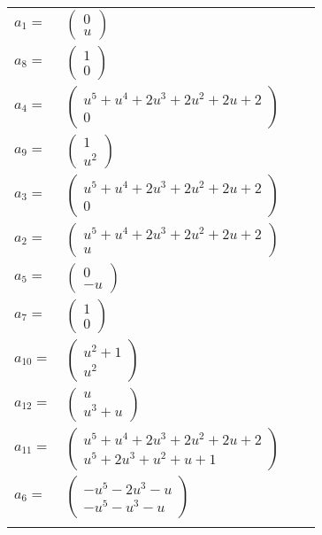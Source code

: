 \documentclass[1p]{elsarticle_modified}
\theoremstyle{definition}
\begin{document}
\begin{tabular}{m{7pt} m{180pt} m{7pt} m{180pt} }
\flushright $a_{1}=$&$\begin{pmatrix}0\\u\end{pmatrix}$ \\
\flushright $a_{8}=$&$\begin{pmatrix}1\\0\end{pmatrix}$ \\
\flushright $a_{4}=$&$\begin{pmatrix}u^5+u^4+2 u^3+2 u^2+2 u+2\\0\end{pmatrix}$ \\
\flushright $a_{9}=$&$\begin{pmatrix}1\\u^2\end{pmatrix}$ \\
\flushright $a_{3}=$&$\begin{pmatrix}u^5+u^4+2 u^3+2 u^2+2 u+2\\0\end{pmatrix}$ \\
\flushright $a_{2}=$&$\begin{pmatrix}u^5+u^4+2 u^3+2 u^2+2 u+2\\u\end{pmatrix}$ \\
\flushright $a_{5}=$&$\begin{pmatrix}0\\- u\end{pmatrix}$ \\
\flushright $a_{7}=$&$\begin{pmatrix}1\\0\end{pmatrix}$ \\
\flushright $a_{10}=$&$\begin{pmatrix}u^2+1\\u^2\end{pmatrix}$ \\
\flushright $a_{12}=$&$\begin{pmatrix}u\\u^3+u\end{pmatrix}$ \\
\flushright $a_{11}=$&$\begin{pmatrix}u^5+u^4+2 u^3+2 u^2+2 u+2\\u^5+2 u^3+u^2+u+1\end{pmatrix}$ \\
\flushright $a_{6}=$&$\begin{pmatrix}- u^5-2 u^3- u\\- u^5- u^3- u\end{pmatrix}$\\&\end{tabular}
\end{document}
